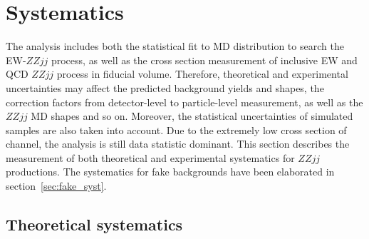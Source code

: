 \section{Systematics}
\label{sec:systematics}

The analysis includes both the statistical fit to MD distribution to search the EW-$ZZjj$ process,
as well as the cross section measurement of inclusive EW and QCD $ZZjj$ process in fiducial volume.
Therefore, theoretical and experimental uncertainties may affect the predicted background yields and shapes, 
the correction factors from detector-level to particle-level measurement, as well as the $ZZjj$ MD shapes and so on.
Moreover, the statistical uncertainties of simulated samples are also taken into account.
Due to the extremely low cross section of \llll channel, the analysis is still data statistic dominant.
This section describes the measurement of both theoretical and experimental systematics for $ZZjj$ productions.
The systematics for fake backgrounds have been elaborated in section~\ref{sec:fake_syst}.

\subsection{Theoretical systematics}

